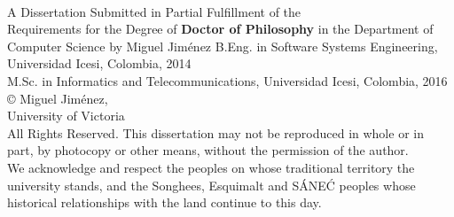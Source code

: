 \thispagestyle{empty}

\begingroup%
\begin{center}
	\vfill
	{\Huge\bfseries \thesistitle \\}
	\vfill
	{A Dissertation Submitted in Partial Fulfillment of the\\Requirements for the Degree of \mylinebreak}
	{\Large\bfseries Doctor of Philosophy \mylinebreak}
	in the Department of Computer Science \mylinebreak
	{by \mylinebreak}
	{\Large Miguel Jim\'{e}nez \mylinebreak}
	{B.Eng. in Software Systems Engineering, Universidad Icesi, Colombia, 2014 \\
		M.Sc. in Informatics and Telecommunications, Universidad Icesi, Colombia, 2016 \\}
	\vfill
	\copyright{} Miguel Jim\'{e}nez, \the\year{}\\
	University of Victoria\\[3em]
	{\footnotesize All Rights Reserved. This dissertation may not be reproduced in whole or in part, by photocopy or other means, without the permission of the author.\\[0.5em]}
	{\footnotesize We acknowledge and respect the \lekwungen{} peoples on whose traditional territory the university stands, and the Songhees, Esquimalt and S\'{A}NE\'{C} peoples whose historical relationships with the land continue to this day.}
\end{center}
\endgroup

\clearpage
